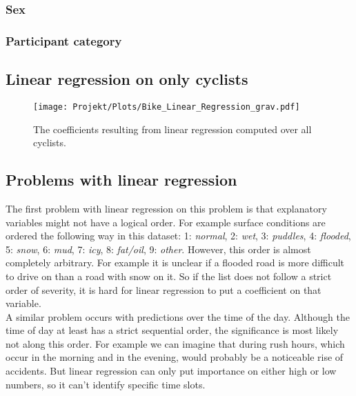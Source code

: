 \documentclass{article}
\begin{document}

\subsubsection{Sex}

\subsubsection{Participant category}

\subsection{Linear regression on only cyclists}

\begin{figure}
  \centering
  \texttt{[image: Projekt/Plots/Bike\_Linear\_Regression\_grav.pdf]}
  \caption{The coefficients resulting from linear regression computed over all cyclists.}
  \label{plot:regression2}
\end{figure}

\subsection{Problems with linear regression}

The first problem with linear regression on this problem is that explanatory variables might not have a logical order. For example surface conditions are ordered the following way in this dataset: 1: \textit{normal}, 2: \textit{wet}, 3: \textit{puddles}, 4: \textit{flooded}, 5: \textit{snow}, 6: \textit{mud}, 7: \textit{icy}, 8: \textit{fat/oil}, 9: \textit{other}.
However, this order is almost completely arbitrary. For example it is unclear if a flooded road is more difficult to drive on than a road with snow on it. So if the list does not follow a strict order of severity, it is hard for linear regression to put a coefficient on that variable.\\
A similar problem occurs with predictions over the time of the day. Although the time of day at least has a strict sequential order, the significance is most likely not along this order. For example we can imagine that during rush hours, which occur in the morning and in the evening, would probably be a noticeable rise of accidents. But linear regression can only put importance on either high or low numbers, so it can't identify specific time slots.
\fi
\end{document}
